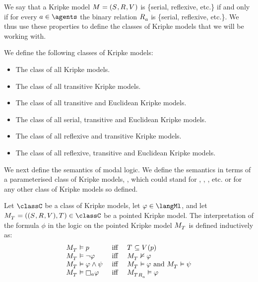 We say that a Kripke model $\modelAndTuple$ is \{serial, reflexive, etc.\} if and only if for every $\agentA \in \agents$ the binary relation $\accessibility{\agentA}$ is \{serial, reflexive, etc.\}.
We thus use these properties to define the classes of Kripke models that we will be working with.

\begin{definition}
We define the following classes of Kripke models:
\begin{itemize}
    \item The class \classK{} of all Kripke models.
    \item The class \classKF{} of all transitive Kripke models.
    \item The class \classKFF{} of all transitive and Euclidean Kripke models.
    \item The class \classKD{} of all serial, transitive and Euclidean Kripke models.
    \item The class \classSF{} of all reflexive and transitive Kripke models.
    \item The class \classS{} of all reflexive, transitive and Euclidean Kripke models.
\end{itemize}
\end{definition}

We next define the semantics of modal logic.
We define the semantics in terms of a parameterised class of Kripke models, \classC{}, which could stand for \classK{}, \classKF{}, \classKFF{}, etc. or for any other class of Kripke models so defined.

\begin{definition}\label{modal-semantics}
Let $\classC$ be a class of Kripke models, let $\phi \in \langMl$, and let $\pointedModelAndTuple{\statesT} \in \classC$ be a pointed Kripke model.
The interpretation of the formula $\phi$ in the logic \logicC{} on the pointed Kripke model $\pointedModel{\statesT}$ is defined inductively as:
$$
\begin{array}{lcl}
\pointedModel{\statesT} \entails \atomP & \text{ iff } & \statesT \subseteq \valuation(\atomP)\\
\pointedModel{\statesT} \entails \lnot \phi & \text{ iff } & \pointedModel{\statesT} \nentails \phi\\
\pointedModel{\statesT} \entails \phi \land \psi & \text{ iff } & \pointedModel{\statesT} \entails \phi \text{ and } \pointedModel{\statesT} \entails \psi\\
\pointedModel{\statesT} \entails \necessary[\agentA] \phi & \text{ iff } & \pointedModel{\successors{\agentA}{\statesT}} \entails \phi
\end{array}
$$
\end{definition}

